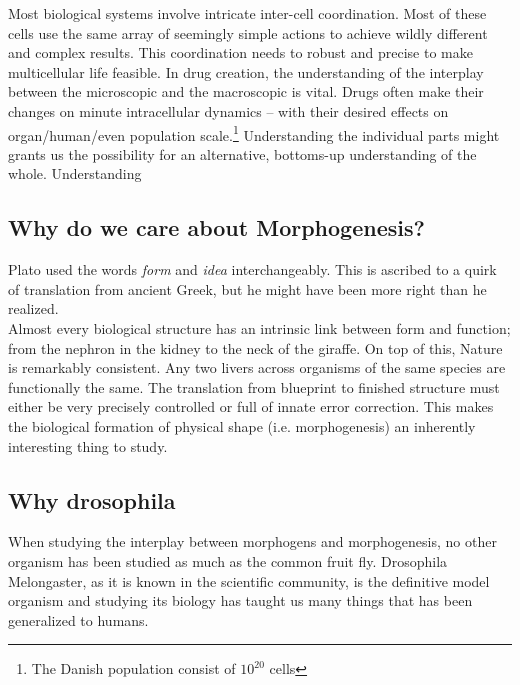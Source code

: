 
Most biological systems involve intricate inter-cell coordination. Most of these cells use the same array of seemingly simple actions to achieve wildly different and complex results. This coordination needs to robust and precise to make multicellular life feasible. In drug creation, the understanding of the interplay between the microscopic and the macroscopic is vital. Drugs often make their changes on minute intracellular dynamics -- with their desired effects on organ/human/even population scale.\footnote{The Danish population consist of $10^{20}$ cells}
Understanding the individual parts might grants us the possibility for an alternative, bottoms-up understanding of the whole. Understanding  

\subsection{Why do we care about Morphogenesis?}
Plato used the words \textit{form} and \textit{idea} interchangeably. This is ascribed to a quirk of translation from ancient Greek, but he might have been more right than he realized.\\ Almost every biological structure has an intrinsic link between form and function; from the nephron in the kidney to the neck of the giraffe.  
On top of this, Nature is remarkably consistent. Any two livers across organisms of the same species are functionally the same. The translation from blueprint to finished structure must either be very precisely controlled or full of innate error correction. This makes the biological formation of physical shape (i.e. morphogenesis) an inherently interesting thing to study. 

\subsection{Why drosophila}
When studying the interplay between morphogens and morphogenesis, no other organism has been studied as much as the common fruit fly. Drosophila Melongaster, as it is known in the scientific community, is the definitive model organism and studying its biology has taught us many things that has been generalized to humans. \\


